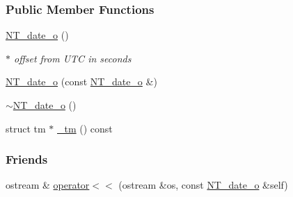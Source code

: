 \subsubsection*{Public Member Functions}
\begin{DoxyCompactItemize}
\item 
\hyperlink{class_n_t__date__o_a94c60974973e1dff9fbbc21552e464ad}{NT\_\-date\_\-o} ()
\begin{DoxyCompactList}\small\item\em $\ast$ offset from UTC in seconds \item\end{DoxyCompactList}\item 
\hyperlink{class_n_t__date__o_a7856e8cdf0a4877d1a809ea03c91e50e}{NT\_\-date\_\-o} (const \hyperlink{class_n_t__date__o}{NT\_\-date\_\-o} \&)
\item 
\hyperlink{class_n_t__date__o_a6dc08d0304db64fd7c214b26b9d6aa39}{$\sim$NT\_\-date\_\-o} ()
\item 
struct tm $\ast$ \hyperlink{class_n_t__date__o_a4d9cc2143062ba6966b60309a6c6a40b}{\_\-tm} () const 
\end{DoxyCompactItemize}
\subsubsection*{Friends}
\begin{DoxyCompactItemize}
\item 
ostream \& \hyperlink{class_n_t__date__o_a28f230f0ebfc72ca13c4cd99ecf3e811}{operator$<$$<$} (ostream \&os, const \hyperlink{class_n_t__date__o}{NT\_\-date\_\-o} \&self)
\end{DoxyCompactItemize}



